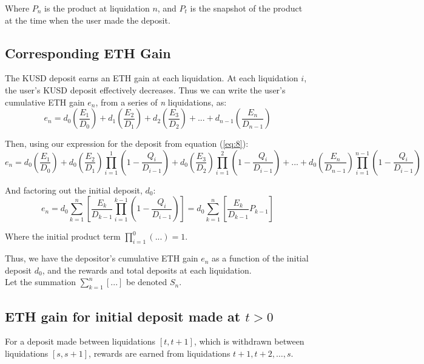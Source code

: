 \documentclass[reqno]{article}
\begin{document}
\bigskip
Where $P_n$ is the product at liquidation $n$, and $P_t$ is the snapshot of the product at the time when the user made the deposit.

\bigskip
\subsection{Corresponding ETH Gain}

\bigskip
The KUSD deposit earns an ETH gain at each liquidation.
At each liquidation $i$, the user’s KUSD deposit effectively decreases. Thus we can write the
user’s cumulative ETH gain $e_{n}$, from a series of \textit{n} liquidations, as:
\begin{equation} 
e_n=d_0\left(\frac{E_1}{D_0}\right)+d_1\left(\frac{E_2}{D_1}\right)+d_2\left(\frac{E_3}{D_2}\right)+...+d_{n-1}\left(\frac{E_n}{D_{n-1}}\right)
\end{equation}

\bigskip
Then, using our expression for the deposit from equation (\ref{eq:8}):
\begin{equation} 
e_n=d_0\left(\frac{E_1}{D_0}\right)+d_0\left(\frac{E_2}{D_1}\right)\prod^1_{i=1}\left(1-\frac{Q_i}{D_{i-1}}\right)+d_0\left(\frac{E_3}{D_2}\right)\prod^2_{i=1}\left(1-\frac{Q_i}{D_{i-1}}\right)+...+d_0\left(\frac{E_n}{D_{n-1}}\right)\prod^{n-1}_{i=1}\left(1-\frac{Q_i}{D_{i-1}}\right)
\end{equation}

\bigskip
And factoring out the initial deposit, $d_0$:
\begin{equation} \label{eq:13}
    e_n=d_0\sum^n_{k=1}\left[\frac{E_k}{D_{k-1}}\prod^{k-1}_{i=1}\left(1-\frac{Q_i}{D_{i-1}}\right)\right] = d_0\sum^n_{k=1}\left[\frac{E_k}{D_{k-1}}P_{k-1}\right]
\end{equation}

\bigskip
Where the initial product term $\displaystyle\prod^0_{i=1}(...)=1$.

\bigskip
Thus, we have the depositor's cumulative ETH gain $e_n$ as a function of the initial deposit $d_0$, and the rewards and total deposits at each liquidation.\\
Let the summation $\displaystyle\sum^n_{k=1}[...]$ be denoted $S_n$.

\bigskip
\subsection{ETH gain for initial deposit made at $t>0$}

\bigskip
For a deposit made between liquidations $[t, t+1]$, which is withdrawn between liquidations $[s, s+1]$, rewards are earned from liquidations $t+1, t+2, \ldots, s$.
\end{document}
